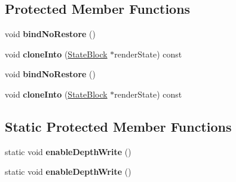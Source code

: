 \subsection*{Protected Member Functions}
\begin{DoxyCompactItemize}
\item 
\mbox{\label{classRenderState_1_1StateBlock_af609a3eb0021a1cb54881c5f9e945bd3}} 
void {\bfseries bind\+No\+Restore} ()
\item 
\mbox{\label{classRenderState_1_1StateBlock_a48743eb308b1ec6b9ef6f166ec5ba9a8}} 
void {\bfseries clone\+Into} (\hyperlink{classRenderState_1_1StateBlock}{State\+Block} $\ast$render\+State) const
\item 
\mbox{\label{classRenderState_1_1StateBlock_af609a3eb0021a1cb54881c5f9e945bd3}} 
void {\bfseries bind\+No\+Restore} ()
\item 
\mbox{\label{classRenderState_1_1StateBlock_a48743eb308b1ec6b9ef6f166ec5ba9a8}} 
void {\bfseries clone\+Into} (\hyperlink{classRenderState_1_1StateBlock}{State\+Block} $\ast$render\+State) const
\end{DoxyCompactItemize}
\subsection*{Static Protected Member Functions}
\begin{DoxyCompactItemize}
\item 
\mbox{\label{classRenderState_1_1StateBlock_ad83eee5bc8ca42d1a209cbab272b406f}} 
static void {\bfseries enable\+Depth\+Write} ()
\item 
\mbox{\label{classRenderState_1_1StateBlock_a81c46fba185552087c1ec16fcf8eba7a}} 
static void {\bfseries enable\+Depth\+Write} ()
\end{DoxyCompactItemize}
